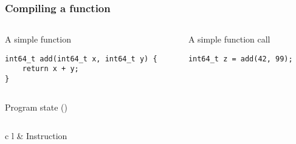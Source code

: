 \documentclass[t]{beamer}
\begin{document}
\begin{frame}[fragile]
\frametitle{Compiling a function}

\begin{columns}
\begin{column}{0.48\textwidth}
\begin{block}{A simple function}
\footnotesize
\begin{verbatim}
int64_t add(int64_t x, int64_t y) {
    return x + y;
}
\end{verbatim}
\end{block}
\end{column}

\begin{column}{0.48\textwidth}
\begin{block}{A simple function call}
\begin{verbatim}
int64_t z = add(42, 99);
\end{verbatim}
\end{block}
\end{column}
\end{columns}

\begin{block}{Program state ()}
\begin{columns}
\begin{column}{0.48\textwidth}
\begin{tabular}{c l}
& Instruction \\
\hline
{}
\end{tabular}
\end{column}


\end{columns}
\end{block}
\end{frame}
\end{document}
